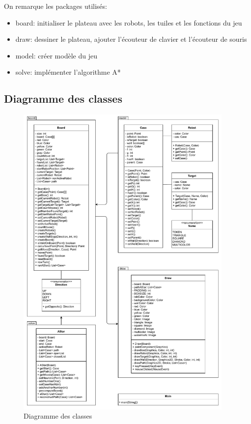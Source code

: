 \documentclass[12pt, pdflatex]{article}
\begin{document}
        \par
        On remarque les packages utilisés:
        \begin{itemize}
            \item board: initialiser le plateau avec les robots, les tuiles et les fonctions du jeu
            \item draw: dessiner le plateau, ajouter l'écouteur de clavier et l'écouteur de souris
            \item model: créer modèle du jeu
            \item solve: implémenter l'algorithme A*
        \end{itemize}

    
    \subsection{Diagramme des classes}
    \begin{figure}[H]
        \centering
        \includegraphics[width=0.95\textwidth]{sources/uml.pdf}
        \caption{Diagramme des classes}
    \end{figure}
\end{document}
